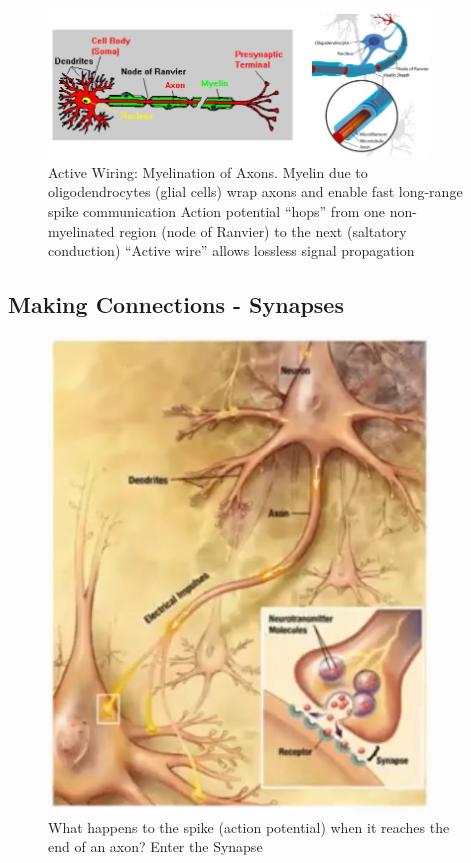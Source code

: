 \documentclass[]{article}
\begin{document}
\begin{figure}[H]
	\caption[Active Wiring: Myelination of Axons]{Active Wiring: Myelination of Axons. Myelin due to oligodendrocytes (glial cells) wrap axons and
		enable fast long-range spike communication
		Action potential “hops” from one non-myelinated region
		(node of Ranvier) to the next (saltatory conduction)
		“Active wire” allows lossless signal propagation}
	\includegraphics[width=0.9\textwidth]{myelination}
\end{figure}



\subsection{Making Connections - Synapses}
\begin{figure}[H]
	\caption[Enter the Synapse]{What happens to the spike (action potential) when	it reaches the 	end of an axon?	Enter the Synapse}\label{fig:enter:the:synapse}
	\includegraphics[width=0.9\textwidth]{enter-synapse}
\end{figure}
\end{document}
